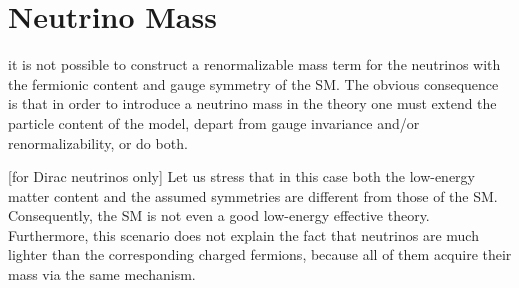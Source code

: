 


\section{Neutrino Mass}
\cite{PDG.pdf} it is not possible to construct a renormalizable mass term for the neutrinos with the fermionic content and gauge symmetry of the SM. The obvious consequence is that in order to introduce a neutrino mass in the theory one must extend the particle content of the model, depart from gauge invariance and/or renormalizability, or do both.

\cite{PFG.pdf} [for Dirac neutrinos only] Let us stress that in this case both the low-energy matter content and the assumed symmetries are different from those of the SM. Consequently, the SM is not even a good low-energy effective theory. Furthermore, this scenario does not explain the fact that neutrinos are much lighter than the corresponding charged fermions, because all of them acquire their mass via the same mechanism.

